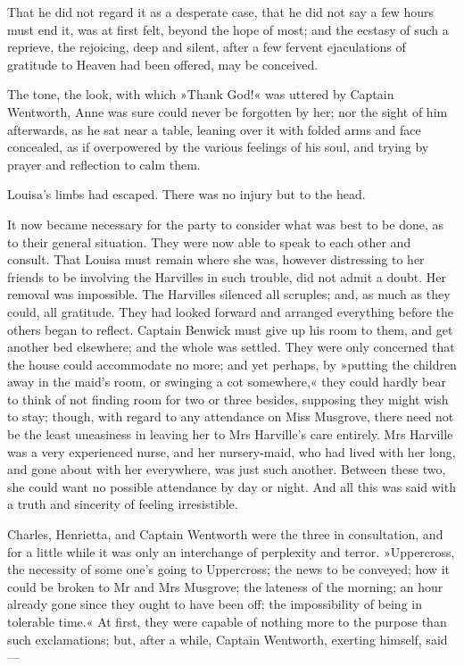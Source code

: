 That he did not regard it as a desperate case, that he did not say a few hours must end it, was at first felt, beyond the hope of most; and the ecstasy of such a reprieve, the rejoicing, deep and silent, after a few fervent ejaculations of gratitude to Heaven had been offered, may be conceived.

The tone, the look, with which »Thank God!« was uttered by Captain Wentworth, Anne was sure could never be forgotten by her; nor the sight of him afterwards, as he sat near a table, leaning over it with folded arms and face concealed, as if overpowered by the various feelings of his soul, and trying by prayer and reflection to calm them.

Louisa's limbs had escaped. There was no injury but to the head.

It now became necessary for the party to consider what was best to be done, as to their general situation. They were now able to speak to each other and consult. That Louisa must remain where she was, however distressing to her friends to be involving the Harvilles in such trouble, did not admit a doubt. Her removal was impossible. The Harvilles silenced all scruples; and, as much as they could, all gratitude. They had looked forward and arranged everything before the others began to reflect. Captain Benwick must give up his room to them, and get another bed elsewhere; and the whole was settled. They were only concerned that the house could accommodate no more; and yet perhaps, by »putting the children away in the maid's room, or swinging a cot somewhere,« they could hardly bear to think of not finding room for two or three besides, supposing they might wish to stay; though, with regard to any attendance on Miss Musgrove, there need not be the least uneasiness in leaving her to Mrs Harville's care entirely. Mrs Harville was a very experienced nurse, and her nursery-maid, who had lived with her long, and gone about with her everywhere, was just such another. Between these two, she could want no possible attendance by day or night. And all this was said with a truth and sincerity of feeling irresistible.

Charles, Henrietta, and Captain Wentworth were the three in consultation, and for a little while it was only an interchange of perplexity and terror. »Uppercross, the necessity of some one's going to Uppercross; the news to be conveyed; how it could be broken to Mr and Mrs Musgrove; the lateness of the morning; an hour already gone since they ought to have been off; the impossibility of being in tolerable time.« At first, they were capable of nothing more to the purpose than such exclamations; but, after a while, Captain Wentworth, exerting himself, said—


